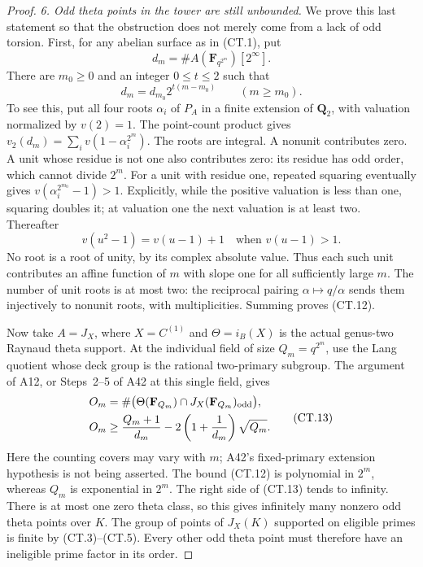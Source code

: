 \documentclass[11pt,a4paper]{article}
\begin{document}
\begin{proof}
\emph{6. Odd theta points in the tower are still unbounded.}
We prove this last statement so that the obstruction does not
merely come from a lack of odd torsion. First, for any abelian
surface as in (CT.1), put
\[
 d_m=\#A(\mathbf F_{q^{2^m}})[2^\infty].
\]
There are $m_0\ge0$ and an integer $0\le t\le2$ such that
\[
                     d_m=d_{m_0}2^{t(m-m_0)}
                         \qquad(m\ge m_0).
 \tag{CT.12}
\]
To see this, put all four roots $\alpha_i$ of $P_A$ in a finite
extension of $\mathbf Q_2$, with valuation normalized by $v(2)=1$.
The point-count product gives
$v_2(d_m)=\sum_i v(1-\alpha_i^{2^m})$.
The roots are integral. A nonunit contributes zero. A unit whose
residue is not one also contributes zero: its residue has odd
order, which cannot divide $2^m$.
For a unit with residue one, repeated squaring eventually gives
$v(\alpha_i^{2^{m_0}}-1)>1$. Explicitly, while the positive
valuation is less than one, squaring doubles it; at valuation
one the next valuation is at least two. Thereafter
\[
  v(u^2-1)=v(u-1)+1\quad\text{when }v(u-1)>1.
\]
No root is a root of unity, by its complex absolute value.
Thus each such unit contributes an affine function of $m$ with
slope one for all sufficiently large $m$.
The number of unit roots is at most two: the reciprocal pairing
$\alpha\mapsto q/\alpha$ sends them injectively to nonunit
roots, with multiplicities. Summing proves (CT.12).

Now take $A=J_X$, where $X=C^{(1)}$ and
$\Theta=i_B(X)$ is the actual genus-two Raynaud theta support.
At the individual field of size $Q_m=q^{2^m}$, use the Lang
quotient whose deck group is the rational two-primary subgroup.
The argument of A12, or Steps~2--5 of A42 at this single field,
gives
\[
 \begin{aligned}
 O_m&=\#\bigl(\Theta(\mathbf F_{Q_m})
                  \cap J_X(\mathbf F_{Q_m})_{\rm odd}\bigr),\\
 O_m&\ge\frac{Q_m+1}{d_m}
                      -2\left(1+\frac1{d_m}\right)\sqrt{Q_m}.
 \end{aligned}
 \tag{CT.13}
\]
Here the counting covers may vary with $m$; A42's fixed-primary
extension hypothesis is not being asserted. The bound (CT.12)
is polynomial in $2^m$, whereas $Q_m$ is exponential in $2^m$.
The right side of (CT.13) tends to infinity. There is at most
one zero theta class, so this gives infinitely many nonzero
odd theta points over $K$.
The group of points of $J_X(K)$ supported on eligible primes
is finite by (CT.3)--(CT.5). Every other odd theta point must
therefore have an ineligible prime factor in its order.
\end{proof}
\end{document}
